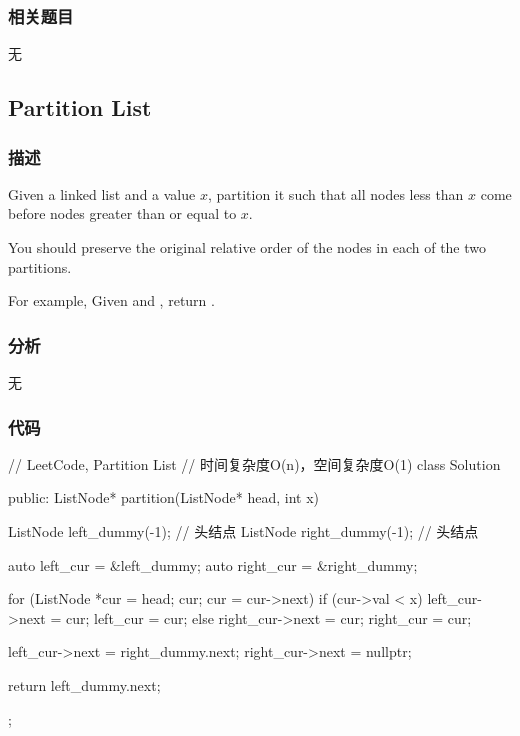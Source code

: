 \subsubsection{相关题目}

\begindot
\item 无
\myenddot


\subsection{Partition List}
\label{sec:partition-list}


\subsubsection{描述}
Given a linked list and a value $x$, partition it such that all nodes less than $x$ come before nodes greater than or equal to $x$.

You should preserve the original relative order of the nodes in each of the two partitions.

For example,
Given  and , return .


\subsubsection{分析}
无


\subsubsection{代码}
\begin{Code}
// LeetCode, Partition List
// 时间复杂度O(n)，空间复杂度O(1)
class Solution {
public:
    ListNode* partition(ListNode* head, int x) {
        ListNode left_dummy(-1); // 头结点
        ListNode right_dummy(-1); // 头结点

        auto left_cur = &left_dummy;
        auto right_cur = &right_dummy;

        for (ListNode *cur = head; cur; cur = cur->next) {
            if (cur->val < x) {
                left_cur->next = cur;
                left_cur = cur;
            } else {
                right_cur->next = cur;
                right_cur = cur;
            }
        }

        left_cur->next = right_dummy.next;
        right_cur->next = nullptr;

        return left_dummy.next;
    }
};
\end{Code}


